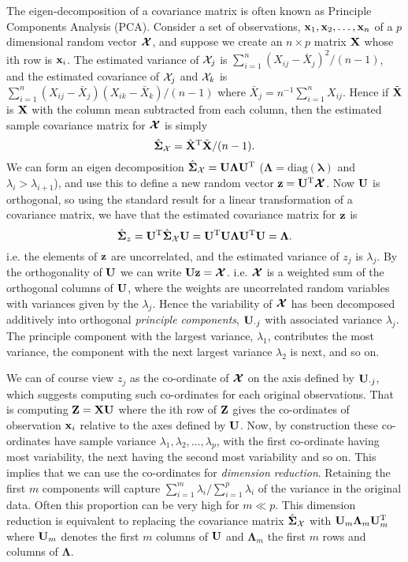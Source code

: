 \documentclass[10pt] {article}
\newcommand{\ts}{^{\rm T}}
\theoremstyle{definition}
\begin{document}
The eigen-decomposition of a covariance matrix is often known as Principle Components Analysis (PCA). Consider a set of observations, ${\bf x}_1, {\bf x}_2, \ldots, {\bf x}_n$ of a $p$ dimensional random vector $\bm{{\cal X}}$, and suppose we create an $n \times p$ matrix ${\bf X}$ whose ith row is ${\bf x}_i$. The estimated variance of ${\cal X}_j$ is $\sum_{i=1}^n (X_{ij} - \bar X_j)^2/(n-1)$, and the estimated covariance of ${\cal X}_j$ and ${\cal X}_k$ is $\sum_{i=1}^n (X_{ij} - \bar X_j)(X_{ik} - \bar X_k)/(n-1)$ where $\bar X_j = n^{-1}\sum_{i=1}^n X_{ij}$. Hence if $\tilde {\bf X}$ is $\bf X$ with the column mean subtracted from each column, then the estimated sample covariance matrix for  $\bm{{\cal X}}$ is simply
$$
\hat {\bm \Sigma}_{\cal X} = \tilde {\bf X}\ts \tilde {\bf X}/(n-1).
$$ 
We can form an eigen decomposition $\hat {\bm \Sigma}_{\cal X} = {\bf U}{\bm \Lambda}{\bf U}\ts$ (${\bm \Lambda} = \text{diag}({\bm \lambda})$ and $\lambda_i>\lambda_{i+1}$), and use this to define a new random vector ${\bf z} = {\bf U}\ts \bm{{\cal X}}$. Now $\bf U$ is orthogonal, so using the standard result for a linear transformation of a covariance matrix, we have that the estimated covariance matrix for $\bf z$ is
$$
\hat {\bm \Sigma}_z = {\bf U}\ts \hat {\bm \Sigma}_{\cal X} {\bf U} = 
{\bf U}\ts{\bf U}{\bm \Lambda}{\bf U}\ts {\bf U} = {\bm \Lambda}.
$$
i.e. the elements of $\bf z$ are uncorrelated, and the estimated variance of $z_j$ is $\lambda_j$. By the orthogonality of $\bf U$ we can write ${\bf Uz}=\bm{{\cal X}}$. i.e. $\bm{{\cal X}}$ is a weighted sum of the orthogonal columns of $\bf U$, where the weights are uncorrelated random variables with variances given by the $\lambda_j$. Hence the variability of $\bm{{\cal X}}$ has been decomposed additively into orthogonal {\em principle components}, ${\bf U}_{\cdot j}$ with associated variance $\lambda_j$. The principle component with the largest variance, $\lambda_1$, contributes the most variance, the component with the next largest variance $\lambda_2$ is next, and so on.      

We can of course view $z_j$ as the co-ordinate of $\bm{{\cal X}}$ on the axis defined by ${\bf U}_{\cdot j}$, which suggests computing such co-ordinates for each original observations. That is computing ${\bf Z} = {\bf XU}$ where the ith row of $\bf Z$ gives the co-ordinates of observation ${\bf x}_i$ relative to the axes defined by $\bf U$. Now, by construction these co-ordinates have sample variance $\lambda_1, \lambda_2,\dots, \lambda_p$, with the first co-ordinate having most variability, the next having the second most variability and so on. This implies that we can use the co-ordinates for {\em dimension reduction}. Retaining the first $m$ components will capture $\sum_{i=1}^m \lambda_i/\sum_{i=1}^p \lambda_i$ of the variance in the original data. Often this proportion can be very high for $m \ll p$. This dimension reduction is equivalent to replacing the covariance matrix $ \hat {\bm \Sigma}_{\cal X}$ with ${\bf U}_m {\bm \Lambda}_m {\bf U}_m\ts$ where ${\bf U}_m$ denotes the first $m$ columns of ${\bf U}$ and ${\bm \Lambda}_m$ the first $m$ rows and columns of $\bm \Lambda$.   
\end{document}
